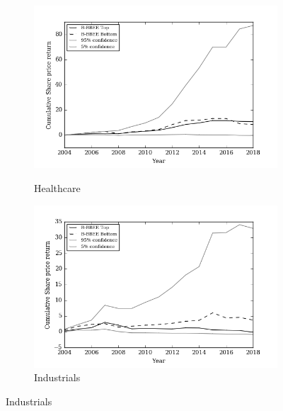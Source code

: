 \begin{figure}[!h]
    \begin{subfigure}{\textwidth}
      \centering
      \includegraphics[width=.8\linewidth]{"Images/Bootstrap_Healthcare_Cumulative"}
      {\small {\it \caption{Healthcare}}}
    \end{subfigure}
    \begin{subfigure}{\textwidth}
      \centering
      \includegraphics[width=.8\linewidth]{"Images/Bootstrap_Industrials_Cumulative"}
      {\small {\caption{Industrials }}}
    \end{subfigure}
\end{figure}

